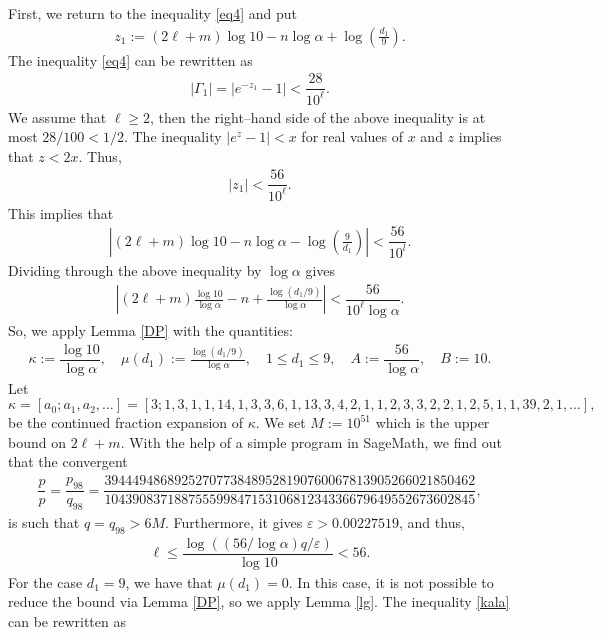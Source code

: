 \documentclass[10pt,a4paper]{article}
\begin{document}
\noindent
First, we return to the inequality \eqref{eq4} and put
\begin{align*}
z_1:=(2\ell+m)\log 10 -n\log\alpha +\log \left(\frac{d_1}{9}\right).
\end{align*}
The inequality \eqref{eq4} can be rewritten as
\begin{align*}
|\Gamma_1|=\left|e^{-z_1}-1\right| < \dfrac{28}{10^{\ell}}.
\end{align*}
We assume that $ \ell\ge 2 $, then the right--hand side of the above inequality is at most $ 28/100 < 1/2 $. The inequality $ |e^z-1|< x $ for real values of $ x $ and $ z $ implies that $ z<2x $. Thus,
\begin{align*}
|z_1|< \dfrac{56}{10^{\ell}}.
\end{align*}
This implies that
\begin{align*}
\left|(2\ell+m)\log 10 -n\log\alpha -\log \left(\frac{9}{d_1}\right)\right| < \dfrac{56}{10^{l}}.
\end{align*}
Dividing through the above inequality by $ \log\alpha $ gives
\begin{align}\label{kala}
\left|(2\ell+m)\frac{\log 10}{\log\alpha} - n + \frac{\log(d_1/9)}{\log\alpha}\right|< \dfrac{56}{10^{\ell}\log\alpha}.
\end{align}
So, we apply Lemma \ref{DP} with the quantities:
\begin{align*}
\kappa:=\dfrac{\log 10}{\log \alpha}, \quad \mu(d_1):=\frac{\log(d_1/9)}{\log\alpha}, \quad 1\le d_1\le 9, \quad A:=\dfrac{56}{\log\alpha}, \quad B:=10.
\end{align*}
Let $$ \kappa=[a_0; a_1, a_2, \ldots]=[3; 1, 3, 1, 1, 14, 1, 3, 3, 6, 1, 13, 3, 4, 2, 1, 1, 2, 3, 3, 2, 2, 1, 2, 5, 1, 1,39, 2, 1, \ldots], $$ be the continued fraction expansion of $ \kappa $. We set $ M:=10^{51} $ which is the upper bound on $ 2\ell+m $. With the help of a simple program in SageMath, we find out that the convergent
\begin{align*}
\dfrac{p}{p}=\dfrac{p_{98}}{q_{98}}=\dfrac{39444948689252707738489528190760067813905266021850462}{10439083718875559984715310681234336679649552673602845},
\end{align*}
is such that $ q=q_{98}>6M $. Furthermore, it gives $ \varepsilon > 0.00227519 $, and thus,
\begin{align*}
\ell\le \dfrac{\log((56/\log\alpha)q/\varepsilon)}{\log 10}<56.
\end{align*}
For the case $ d_1=9 $, we have that $ \mu(d_1)=0 $. In this case, it is not possible to reduce the bound via Lemma \ref{DP}, so we apply Lemma \ref{lg}. The inequality \eqref{kala} can be rewritten as
\end{document}
